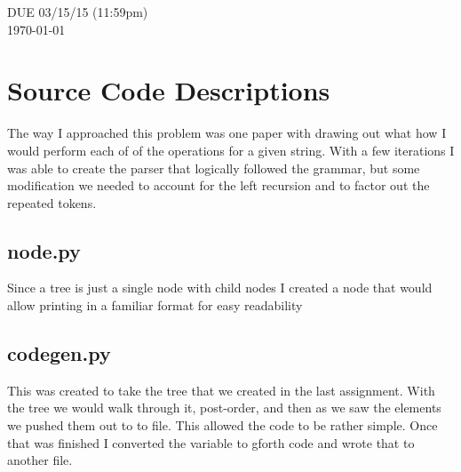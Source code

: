 \documentclass[letterpaper,10pt]{article}
\begin{document}
\begin{titlepage}

DUE 03/15/15 (11:59pm)\\
{\large \today}\\[3cm] %


 

\vfill %

\end{titlepage}

\tableofcontents
\vfill %
\newpage

\section{Source Code Descriptions}
\begin{mdframed}[style=MyFrame]
The way I approached this problem was one paper with drawing out what how I would perform each of of the operations for a given string. With a few iterations I was able to create the parser that logically followed the grammar, but some modification we needed to account for the left recursion and to factor out the repeated tokens. 
\end{mdframed}
\subsection{node.py}
\begin{mdframed}[style=MyFrame]
Since a tree is just a single node with child nodes I created a node that would allow printing in a familiar format for easy readability 
\end{mdframed}
\subsection{codegen.py}
\begin{mdframed}[style=MyFrame]
This was created to take the tree that we created in the last assignment. With the tree we would walk through it, post-order, and then as we saw the elements we pushed them out to to file. This allowed the code to be rather simple. Once that was finished I converted the variable to gforth code and wrote that to another file.
\end{mdframed}
\end{document}
